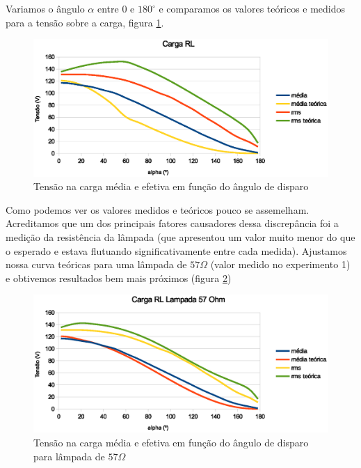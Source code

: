 \documentclass{article}
\begin{document}
Variamos o ângulo $\alpha$ entre $0$ e $180^\circ$ e comparamos os valores teóricos e medidos para a tensão sobre a carga, figura \ref{fig:rlalpha}.
\begin{figure}[H]
	\centering
	\includegraphics[width=0.7\linewidth]{dados/RL/rl_alpha}
	\caption{Tensão na carga média e efetiva em função do ângulo de disparo}
	\label{fig:rlalpha}
\end{figure}
Como podemos ver os valores medidos e teóricos pouco se assemelham. Acreditamos que um dos principais fatores causadores dessa discrepância foi a medição da resistência da lâmpada (que apresentou um valor muito menor do que o esperado e estava flutuando significativamente entre cada medida). Ajustamos nossa curva teóricas para uma lâmpada de $57 \Omega$ (valor medido no experimento 1) e obtivemos resultados bem mais próximos (figura \ref{fig:rlalpha57})
\begin{figure}[H]
	\centering
	\includegraphics[width=0.7\linewidth]{dados/RL/rl_alpha57Ohm}
	\caption{Tensão na carga média e efetiva em função do ângulo de disparo para lâmpada de $57 \Omega$}
	\label{fig:rlalpha57}
\end{figure}



\end{document}
